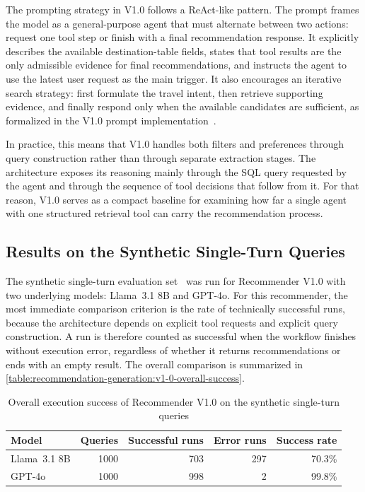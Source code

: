 The prompting strategy in V1.0 follows a ReAct-like pattern. The prompt frames the model as a general-purpose agent that must alternate between two actions: request one tool step or finish with a final recommendation response. It explicitly describes the available destination-table fields, states that tool results are the only admissible evidence for final recommendations, and instructs the agent to use the latest user request as the main trigger. It also encourages an iterative search strategy: first formulate the travel intent, then retrieve supporting evidence, and finally respond only when the available candidates are sufficient, as formalized in the V1.0 prompt implementation~\parencite{v10RecommenderPrompt}.

In practice, this means that V1.0 handles both filters and preferences through query construction rather than through separate extraction stages. The architecture exposes its reasoning mainly through the SQL query requested by the agent and through the sequence of tool decisions that follow from it. For that reason, V1.0 serves as a compact baseline for examining how far a single agent with one structured retrieval tool can carry the recommendation process.

\subsection{Results on the Synthetic Single-Turn Queries}\label{subsection:recommendation-generation:recommender-v1-0-results}

The synthetic single-turn evaluation set~\parencite{syntheticSingleTurnEval} was run for Recommender V1.0 with two underlying models: Llama~3.1 8B and GPT-4o. For this recommender, the most immediate comparison criterion is the rate of technically successful runs, because the architecture depends on explicit tool requests and explicit query construction. A run is therefore counted as successful when the workflow finishes without execution error, regardless of whether it returns recommendations or ends with an empty result. The overall comparison is summarized in \autoref{table:recommendation-generation:v1-0-overall-success}.

\begin{table}[htbp]
\centering
\begin{tabular}{lrrrr}
\hline
Model & Queries & Successful runs & Error runs & Success rate \\
\hline
Llama~3.1 8B & 1000 & 703 & 297 & 70.3\% \\
GPT-4o & 1000 & 998 & 2 & 99.8\% \\
\hline
\end{tabular}
\caption{Overall execution success of Recommender V1.0 on the synthetic single-turn queries}
\label{table:recommendation-generation:v1-0-overall-success}
\end{table}

